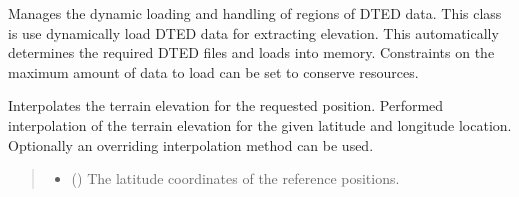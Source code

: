 \documentclass[letterpaper,10pt,english]{sphinxmanual}
\begin{document}

\begin{fulllineitems}
\label{\detokenize{modules/earth/dted:qnav.earth.dted.DtedHandler}}
\pysigstartsignatures
{}
\pysigstopsignatures
\sphinxAtStartPar
Manages the dynamic loading and handling of regions of DTED data.
This class is use dynamically load DTED data for extracting elevation.
This automatically determines the required DTED files and loads into
memory. Constraints on the maximum amount of data to load can be set to
conserve resources.

\begin{fulllineitems}
\label{\detokenize{modules/earth/dted:qnav.earth.dted.DtedHandler.get_elevation}}
\pysigstartsignatures
{}
\pysigstopsignatures
\sphinxAtStartPar
Interpolates the terrain elevation for the requested position.
Performed interpolation of the terrain elevation for the given
latitude and longitude location. Optionally an overriding
interpolation method can be used.
\begin{quote}\begin{description}
\begin{itemize}
\item {} 
\sphinxAtStartPar
{} () \textendash{} The latitude coordinates of the reference positions.


\end{itemize}
\end{description}
\end{quote}
\end{fulllineitems}
\end{fulllineitems}
\end{document}
